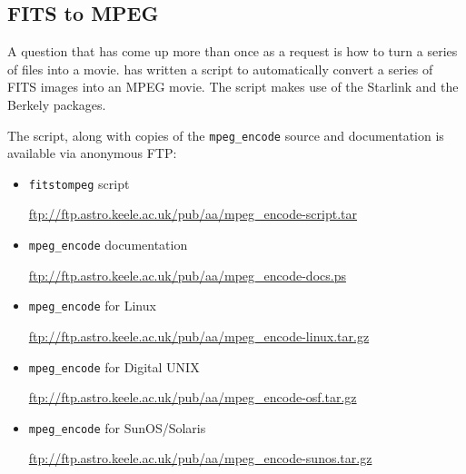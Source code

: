 \documentclass[twoside,11pt]{starlink}
\begin{document}
\subsection{FITS to MPEG\label{sc15_fits2mpeg}}

A question that has come up more than once as a
 request
is how to turn a series of
 files into a
movie. 
has written a script to automatically convert a series of FITS images
into an MPEG movie. The script makes use of the Starlink
 and the Berkely
packages.

The script, along with copies of the \texttt{mpeg\_encode} source and
documentation is available via anonymous FTP:

\begin{itemize}
\item {\texttt{fitstompeg} script}\\
\begin{small}\url{ftp://ftp.astro.keele.ac.uk/pub/aa/mpeg_encode-script.tar}\end{small}
\item {\texttt{mpeg\_encode} documentation}\\
\begin{small}\url{ftp://ftp.astro.keele.ac.uk/pub/aa/mpeg_encode-docs.ps}\end{small}
\item {\texttt{mpeg\_encode} for Linux}\\
\begin{small}\url{ftp://ftp.astro.keele.ac.uk/pub/aa/mpeg_encode-linux.tar.gz}\end{small}
\item {\texttt{mpeg\_encode} for Digital UNIX}\\
\begin{small}\url{ftp://ftp.astro.keele.ac.uk/pub/aa/mpeg_encode-osf.tar.gz}\end{small}
\item {\texttt{mpeg\_encode} for SunOS/Solaris}\\
\begin{small}\url{ftp://ftp.astro.keele.ac.uk/pub/aa/mpeg_encode-sunos.tar.gz}\end{small}
\end{itemize}
\end{document}
